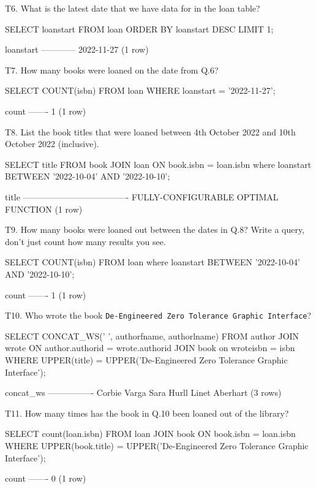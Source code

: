 T6. What is the latest date that we have data for in the loan table?
\begin{sql}
SELECT loanstart FROM loan ORDER BY loanstart DESC LIMIT 1;
\end{sql}
\begin{pseudo}
 loanstart
------------
 2022-11-27
(1 row)
\end{pseudo}

T7. How many books were loaned on the date from Q.6?
\begin{sql}
SELECT COUNT(isbn) FROM loan
WHERE loanstart = '2022-11-27';
\end{sql}
\begin{pseudo}
 count
-------
     1
(1 row)
\end{pseudo}

T8. List the book titles that were loaned between 4th October 2022 and 10th October 2022 (inclusive).
\begin{sql}
SELECT title FROM book
JOIN loan ON book.isbn = loan.isbn
where loanstart BETWEEN '2022-10-04' AND '2022-10-10';
\end{sql}

\begin{pseudo}
                title
-------------------------------------
 FULLY-CONFIGURABLE OPTIMAL FUNCTION
(1 row)
\end{pseudo}

T9. How many books were loaned out between the dates in Q.8? Write a query, don't just count how many results you see.
\begin{sql}
SELECT COUNT(isbn) FROM loan
where loanstart BETWEEN '2022-10-04' AND '2022-10-10';
\end{sql}
\begin{pseudo}
 count
-------
     1
(1 row)
\end{pseudo}

T10. Who wrote the book \verb|De-Engineered Zero Tolerance Graphic Interface|?
\begin{sql}
SELECT CONCAT_WS(' ', authorfname, authorlname) FROM author
JOIN wrote ON author.authorid = wrote.authorid
JOIN book on wroteisbn = isbn
WHERE UPPER(title) = UPPER('De-Engineered Zero Tolerance Graphic Interface');
\end{sql}
\begin{pseudo}
   concat_ws
----------------
 Corbie Varga
 Sara Hurll
 Linet Aberhart
(3 rows)
\end{pseudo}

T11. How many times has the book in Q.10 been loaned out of the library?
\begin{sql}
SELECT count(loan.isbn) FROM loan
JOIN book ON book.isbn = loan.isbn
WHERE UPPER(book.title) = UPPER('De-Engineered Zero Tolerance Graphic Interface');
\end{sql}
\begin{pseudo}
 count
-------
     0
(1 row)
\end{pseudo}


